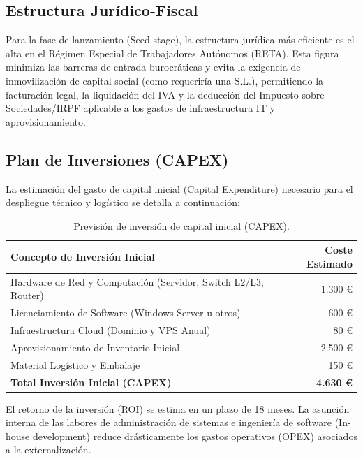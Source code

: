\documentclass[12pt,a4paper]{article}
\begin{document}
\subsection{Estructura Jurídico-Fiscal}
Para la fase de lanzamiento (Seed stage), la estructura jurídica más eficiente es el alta en el Régimen Especial de Trabajadores Autónomos (RETA). Esta figura minimiza las barreras de entrada burocráticas y evita la exigencia de inmovilización de capital social (como requeriría una S.L.), permitiendo la facturación legal, la liquidación del IVA y la deducción del Impuesto sobre Sociedades/IRPF aplicable a los gastos de infraestructura IT y aprovisionamiento.

\subsection{Plan de Inversiones (CAPEX)}
La estimación del gasto de capital inicial (Capital Expenditure) necesario para el despliegue técnico y logístico se detalla a continuación:

\begin{table}[H]
    \centering
    \begin{tabular}{|l|r|}
        \hline
        \textbf{Concepto de Inversión Inicial} & \textbf{Coste Estimado} \\
        \hline
        Hardware de Red y Computación (Servidor, Switch L2/L3, Router) & 1.300 € \\
        \hline
        Licenciamiento de Software (Windows Server u otros) & 600 € \\
        \hline
        Infraestructura Cloud (Dominio y VPS Anual) & 80 € \\
        \hline
        Aprovisionamiento de Inventario Inicial & 2.500 € \\
        \hline
        Material Logístico y Embalaje & 150 € \\
        \hline
        \textbf{Total Inversión Inicial (CAPEX)} & \textbf{4.630 €} \\
        \hline
    \end{tabular}
    \caption{Previsión de inversión de capital inicial (CAPEX).}
\end{table}

El retorno de la inversión (ROI) se estima en un plazo de 18 meses. La asunción interna de las labores de administración de sistemas e ingeniería de software (In-house development) reduce drásticamente los gastos operativos (OPEX) asociados a la externalización.
\end{document}
